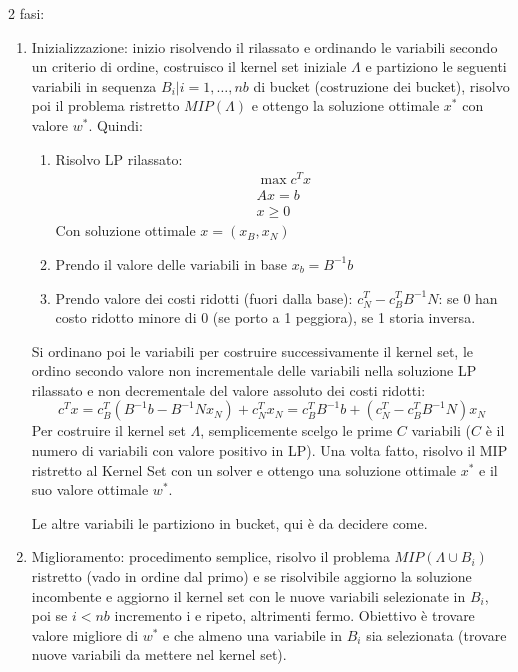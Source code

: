 2 fasi:
\begin{enumerate}
	\item Inizializzazione: inizio risolvendo il rilassato e ordinando le variabili secondo un criterio di ordine, costruisco il kernel set iniziale $\Lambda$ e partiziono le seguenti variabili in sequenza ${B_i|i=1,\dots, nb}$ di bucket (costruzione dei bucket), risolvo poi il problema ristretto $MIP(\Lambda)$ e ottengo la soluzione ottimale $x^*$ con valore $w^*$. Quindi:
	\begin{enumerate}
		\item Risolvo LP rilassato:
		\begin{equation*}
			\begin{aligned}
				\max c^Tx \\
				Ax=b \\
				x\ge 0
			\end{aligned}
		\end{equation*}
		Con soluzione ottimale $x=(x_B,x_N)$
		\item Prendo il valore delle variabili in base $x_b=B^{-1}b$
		\item Prendo valore dei costi ridotti (fuori dalla base): $c_N^T-c_B^TB^{-1}N$: se 0 han costo ridotto minore di 0 (se porto a 1 peggiora), se 1 storia inversa.
	\end{enumerate}
	Si ordinano poi le variabili per costruire successivamente il kernel set, le ordino secondo valore non incrementale delle variabili nella soluzione LP rilassato e non decrementale del valore assoluto dei costi ridotti:
	\begin{equation*}
		c^Tx=c_B^T(B^{-1}b-B^{-1}Nx_N)+c_N^{T}x_N=c_B^TB^{-1}b+(c_N^T-c_B^TB^{-1}N)x_N
	\end{equation*}
	Per costruire il kernel set $\Lambda$, semplicemente scelgo le prime $C$ variabili ($C$ è il numero di variabili con valore positivo in LP). Una volta fatto, risolvo il MIP ristretto al Kernel Set con un solver e ottengo una soluzione ottimale $x^*$ e il suo valore ottimale $w^*$. 
	
	Le altre variabili le partiziono in bucket, qui è da decidere come.
	
	\item Miglioramento: procedimento semplice, risolvo il problema $MIP(\Lambda \cup B_i)$ ristretto (vado in ordine dal primo) e se risolvibile aggiorno la soluzione incombente e aggiorno il kernel set con le nuove variabili selezionate in $B_i$, poi se $i<nb$ incremento i e ripeto, altrimenti fermo. Obiettivo è trovare valore migliore di $w^*$ e che almeno una variabile in $B_i$ sia selezionata (trovare nuove variabili da mettere nel kernel set). 
	

\end{enumerate}
